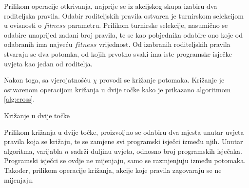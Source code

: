\documentclass[times, utf8, zavrsni]{fer}
\begin{document}
Prilikom operacije otkrivanja, najprije se iz akcijskog skupa izabiru dva roditeljska pravila.
Odabir roditeljskih pravila ostvaren je turnirskom selekcijom  u ovisnosti o $fitness$ parametru.
Prilikom turnirske selekcije, nasumično se odabire unaprijed zadani broj pravila, te se kao pobjednika odabire ono koje od odabranih ima najveću $fitness$ vrijednost.
Od izabranih roditeljskih pravila stvaraju se dva potomka, od kojih prvotno svaki ima iste programske isječke uvjeta kao jedan od roditelja.

Nakon toga, sa vjerojatnošću $\chi$ provodi se križanje  potomaka.
Križanje je ostvarenom operacijom križanja u dvije točke  kako je prikazano algoritmom \ref{alg:cross}.
\begin{algorithm}[h]
\caption{Križanje u dvije točke}
\label{alg:cross}
\begin{algorithmic}
\STATE{$x :=$ proizvoljan decimalni broj iz intervala [0, n)}
\STATE{$y :=$ proizvoljan decimalni broj iz intervala [0, n)}
\ENDIF
{}
\ENDFOR
\end{algorithmic}
\end{algorithm}
Prilikom križanja u dvije točke, proizvoljno se odabiru dva mjesta unutar uvjeta pravila koja se križaju, te se zamjene svi programski isječci između njih.
Unutar algoritma, varijabla $n$ sadrži duljinu uvjeta, odnosno broj programskih isječaka.
Programski isječci se ovdje ne mijenjaju, samo se razmjenjuju između potomaka.
Također, prilikom operacije križanja, akcije koje pravila zagovaraju se ne mijenjaju.
\end{document}
